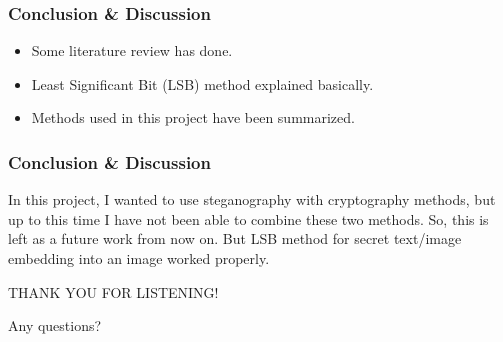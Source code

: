 \documentclass[12pt,hyperref={unicode}]{beamer}
\begin{document}
\begin{frame}
\frametitle{Conclusion \& Discussion}

\begin{itemize}
\item Some literature review has done. %
\item Least Significant Bit (LSB) method explained basically.
\item Methods used in this project have been summarized. %
\end{itemize}
\end{frame}
\begin{frame}
\frametitle{Conclusion \& Discussion}
\begin{centering}
In this project, I wanted to use steganography with cryptography methods, but up to this time I have not been able to combine these two methods. So, this is left as a future work from now on. But LSB method for secret text/image embedding into an image worked properly.
\end{centering}
\end{frame}
\begin{frame}
\begin{centering}THANK YOU FOR LISTENING!\\\end{centering}
\begin{centering}Any questions?\\\end{centering}

\end{frame}
\end{document}
